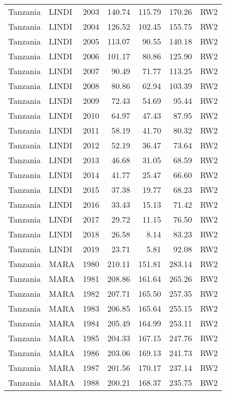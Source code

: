 \begin{longtable}{lllrrrl}
  Tanzania & LINDI & 2003 & 140.74 & 115.79 & 170.26 & RW2 \\ 
  Tanzania & LINDI & 2004 & 126.52 & 102.45 & 155.75 & RW2 \\ 
  Tanzania & LINDI & 2005 & 113.07 & 90.55 & 140.18 & RW2 \\ 
  Tanzania & LINDI & 2006 & 101.17 & 80.86 & 125.90 & RW2 \\ 
  Tanzania & LINDI & 2007 & 90.49 & 71.77 & 113.25 & RW2 \\ 
  Tanzania & LINDI & 2008 & 80.86 & 62.94 & 103.39 & RW2 \\ 
  Tanzania & LINDI & 2009 & 72.43 & 54.69 & 95.44 & RW2 \\ 
  Tanzania & LINDI & 2010 & 64.97 & 47.43 & 87.95 & RW2 \\ 
  Tanzania & LINDI & 2011 & 58.19 & 41.70 & 80.32 & RW2 \\ 
  Tanzania & LINDI & 2012 & 52.19 & 36.47 & 73.64 & RW2 \\ 
  Tanzania & LINDI & 2013 & 46.68 & 31.05 & 68.59 & RW2 \\ 
  Tanzania & LINDI & 2014 & 41.77 & 25.47 & 66.60 & RW2 \\ 
  Tanzania & LINDI & 2015 & 37.38 & 19.77 & 68.23 & RW2 \\ 
  Tanzania & LINDI & 2016 & 33.43 & 15.13 & 71.42 & RW2 \\ 
  Tanzania & LINDI & 2017 & 29.72 & 11.15 & 76.50 & RW2 \\ 
  Tanzania & LINDI & 2018 & 26.58 & 8.14 & 83.23 & RW2 \\ 
  Tanzania & LINDI & 2019 & 23.71 & 5.81 & 92.08 & RW2 \\ 
  Tanzania & MARA & 1980 & 210.11 & 151.81 & 283.14 & RW2 \\ 
  Tanzania & MARA & 1981 & 208.86 & 161.64 & 265.26 & RW2 \\ 
  Tanzania & MARA & 1982 & 207.71 & 165.50 & 257.35 & RW2 \\ 
  Tanzania & MARA & 1983 & 206.85 & 165.64 & 255.15 & RW2 \\ 
  Tanzania & MARA & 1984 & 205.49 & 164.99 & 253.11 & RW2 \\ 
  Tanzania & MARA & 1985 & 204.33 & 167.15 & 247.76 & RW2 \\ 
  Tanzania & MARA & 1986 & 203.06 & 169.13 & 241.73 & RW2 \\ 
  Tanzania & MARA & 1987 & 201.56 & 170.17 & 237.14 & RW2 \\ 
  Tanzania & MARA & 1988 & 200.21 & 168.37 & 235.75 & RW2 \\ 

\end{longtable}
